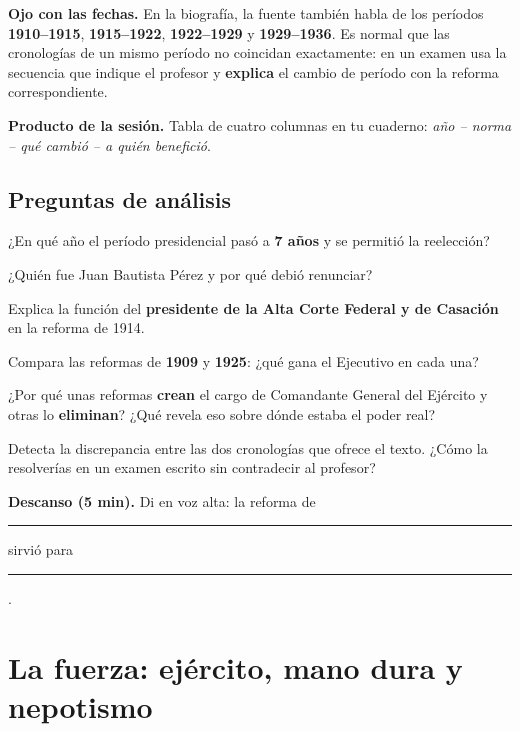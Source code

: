 \documentclass[12pt, letterpaper]{article}
\makeatletter
\let\mw@oldsection\section
\newcommand{\mw@prepage}{%
  \par
  \ifdim\pagegoal=\maxdimen\else
    \ifdim\dimexpr\pagegoal-\pagetotal\relax<7cm\relax
      \newpage
    \fi
  \fi}
\renewcommand{\section}{\mw@prepage\mw@oldsection}
\newcommand{\pausa}[1]{%
  \begin{descanso}
    \small\textbf{\color{mwnaranja}Descanso (5 min).} #1
  \end{descanso}%
}
\makeatother
\begin{document}
\begin{cuadroadvertencia}
  \small
  \textbf{Ojo con las fechas.} En la biografía, la fuente también habla de los
  períodos \textbf{1910--1915}, \textbf{1915--1922}, \textbf{1922--1929} y
  \textbf{1929--1936}. Es normal que las cronologías de un mismo período no
  coincidan exactamente: en un examen usa la secuencia que indique el profesor y
  \textbf{explica} el cambio de período con la reforma correspondiente.
\end{cuadroadvertencia}

\begin{cuadropasos}
  \small
  \textbf{Producto de la sesión.} Tabla de cuatro columnas en tu cuaderno:
  \textit{año -- norma -- qué cambió -- a quién benefició}.
\end{cuadropasos}

\subsection*{Preguntas de análisis}
\begin{preguntas}
  \item \facil{} ¿En qué año el período presidencial pasó a \textbf{7 años} y se
        permitió la reelección?
  \item \facil{} ¿Quién fue Juan Bautista Pérez y por qué debió renunciar?
  \item \medio{} Explica la función del \textbf{presidente de la Alta Corte
        Federal y de Casación} en la reforma de 1914.
  \item \dificil{} Compara las reformas de \textbf{1909} y \textbf{1925}: ¿qué
        gana el Ejecutivo en cada una?
  \item \dificil{} ¿Por qué unas reformas \textbf{crean} el cargo de Comandante
        General del Ejército y otras lo \textbf{eliminan}? ¿Qué revela eso sobre
        dónde estaba el poder real?
  \item \muyDificil{} Detecta la discrepancia entre las dos cronologías que ofrece
        el texto. ¿Cómo la resolverías en un examen escrito sin contradecir al
        profesor?
\end{preguntas}

\pausa{Di en voz alta: \guillemotleft la reforma de \rule{1.6cm}{0.4pt} sirvió
para \rule{3cm}{0.4pt}\guillemotright.}

\section{La fuerza: ejército, mano dura y nepotismo}
\end{document}
